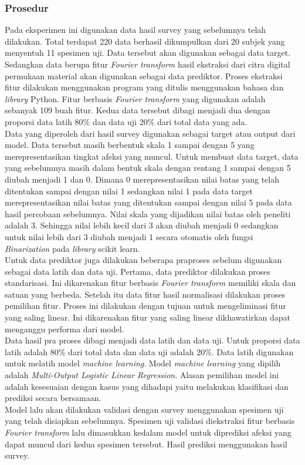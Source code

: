 \documentclass{Jurnal_kolo}
\begin{document}
\begin{multicols}{2}
	\subsubsection{Prosedur}
	\indent Pada eksperimen ini digunakan data hasil survey yang sebelumnya telah dilakukan. Total terdapat 220 data berhasil dikumpulkan dari 20 subjek yang menyentuh 11 spesimen uji. Data tersebut akan digunakan sebagai data target. Sedangkan data berupa fitur \emph{Fourier transform} hasil ekstraksi dari citra digital permukaan material akan digunakan sebagai data prediktor. Proses ekstraksi fitur dilakukan menggunakan program yang ditulis menggunakan bahasa dan \emph{library} Python. Fitur berbasis \emph{Fourier transform} yang digunakan adalah sebanyak 109 buah fitur. Kedua data tersebut dibagi menjadi dua dengan proporsi data latih 80\% dan data uji 20\% dari total data yang ada.\\	
	\indent Data yang diperoleh dari hasil survey digunakan sebagai target atau output dari model. Data tersebut masih berbentuk skala 1 sampai dengan 5 yang merepresentasikan tingkat afeksi yang muncul. Untuk membuat data target, data yang sebelumnya masih dalam bentuk skala dengan rentang 1 sampai dengan 5 diubah menjadi 1 dan 0. Dimana 0 merepresentasikan nilai batas yang telah ditentukan sampai dengan nilai 1 sedangkan nilai 1 pada data target merepresentasikan nilai batas yang ditentukan sampai dengan nilai 5 pada data hasil percobaan sebelumnya. Nilai skala yang dijadikan nilai batas oleh peneliti adalah 3. Sehingga nilai lebih kecil dari 3 akan diubah menjadi 0 sedangkan untuk nilai lebih dari 3 diubah menjadi 1 secara otomatis oleh fungsi \emph{Binarization} pada \emph{library}  scikit learn.\\
	\indent Untuk data prediktor juga dilakukan beberapa praproses sebelum digunakan sebagai data latih dan data uji. Pertama, data prediktor dilakukan proses standarisasi. Ini dikarenakan fitur berbasis \emph{Fourier transform} memiliki skala dan satuan yang berbeda. Setelah itu data fitur hasil normalisasi dilakukan proses pemilihan fitur. Proses ini dilakukan dengan tujuan untuk mengeliminasi fitur yang saling linear. Ini dikarenakan fitur yang saling linear dikhawatirkan dapat menganggu performa dari model.\\
	\indent Data hasil pra proses dibagi menjadi data latih dan data uji. Untuk proporsi data latih adalah 80\% dari total data dan data uji adalah 20\%. Data latih digunakan untuk melatih model \emph{machine learning}. Model \emph{machine learning} yang dipilih adalah \emph{Multi-Output Logistic Linear Regression}. Alasan pemilihan model ini adalah kesesuaian dengan kasus yang dihadapi yaitu melakukan klasifikasi dan prediksi secara bersamaan.\\
	\indent Model lalu akan dilakukan validasi dengan survey menggunakan spesimen uji yang telah disiapkan sebelumnya. Spesimen uji validasi diekstraksi fitur berbasis \emph{Fourier transform} lalu dimasukkan kedalam model untuk diprediksi afeksi yang dapat muncul dari kedua spesimen tersebut. Hasil prediksi menggunakan hasil survey.
	

\end{multicols}
\end{document}
